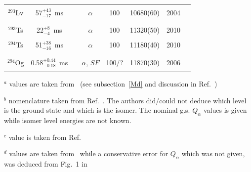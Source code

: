 \begin{center}
\begin{longtable}{c|ccccccl}
			&				&			&					&			& 				&		&{\tiny\cite{Oganessian2015,Kaji2017,Oganessian2017}}\\
$^{293}$Lv	& 57$^{+43}_{-17}$~ms&		&$\alpha$			&100		&10680(60)		&2004	&{\tiny\cite{Oganessian2004,Oganessian2004a,Oganessian2005a,Oganessian2011a,Hofmann2012,Morita2014}}\\
			&				&			&					&			& 				&		&{\tiny\cite{Oganessian2015,Kaji2017,Oganessian2017}}\\
\hline\\
$^{293}$Ts	& 22$^{+8}_{-4}$~ms& 		&$\alpha$			&100		&11320(50)		&2010	&{\tiny\cite{Oganessian2010,Oganessian2011,Oganessian2011a,Oganessian2012a,Oganessian2013b,Oganessian2015}}\\
			&				&			&					&			& 				&		&{\tiny\cite{Forsberg2016a,Oganessian2017,Khuyagbaatar2019}}\\
$^{294}$Ts	& 51$^{+38}_{-16}$~ms& 		&$\alpha$			&100		&11180(40)		&2010	&{\tiny\cite{Oganessian2010,Oganessian2011,Oganessian2011a,Oganessian2012a,Oganessian2013b,Oganessian2015}}\\
			&				&			&					&			& 				&		&{\tiny\cite{Forsberg2016a,Oganessian2017,Khuyagbaatar2019}}\\
\hline\\
$^{294}$Og	& 0.58$^{+0.44}_{-0.18}$~ms&&$\alpha$, $SF$		&100/?		&11870(30)		&2006	&{\tiny\cite{Oganessian2006,Oganessian2011a,Oganessian2007,Oganessian2007a,Oganessian2011a,Oganessian2012a}}\\
			&				&			&					&			& 				&		&{\tiny\cite{Oganessian2015,Oganessian2017,Brewer2018}}\\
\hline
\end{longtable}
\begin{tablenotes}\scriptsize
\item{$^a$} values are taken from~\cite{Khuyagbaatar2020} (see subsection~\ref{Md} and discussion in Ref.~\cite{Hessberger2021})
\item{$^b$} nomenclature taken from Ref.~\cite{Antalic2010}. The authors did/could not deduce which level is the ground state and which is the isomer. The nominal g.s. $Q_\alpha$ values is given while isomer level energies are not known.
\item{$^c$} value is taken from Ref.~\cite{Hessberger2022}
\item{$^d$} values are taken from~\cite{Svirikhin2021}  while a conservative error for $Q_\alpha$ which was not given, was deduced from Fig.~1 in~\cite{Svirikhin2021}

\end{tablenotes}
\end{center}
